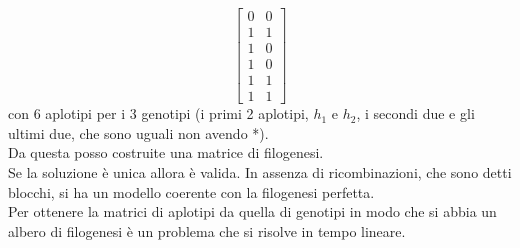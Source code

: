 \documentclass[a4paper,12pt, oneside]{book}
\begin{document}
\[\left[
  \begin{matrix}
    0 & 0\\
    1 & 1\\
    1 & 0\\
    1 & 0\\
    1 & 1\\
    1 & 1
  \end{matrix}\right]
\]
con 6 aplotipi per i 3 genotipi (i primi 2 aplotipi, $h_1$ e $h_2$, i secondi
due e gli ultimi due, che sono uguali non avendo *).\\
Da questa posso costruite una matrice di filogenesi.\\
Se la soluzione è unica allora è valida. In assenza di ricombinazioni, che sono
detti blocchi, si ha un modello coerente con la filogenesi perfetta.\\
Per ottenere la matrici di aplotipi da quella di genotipi in modo che si abbia
un albero di filogenesi è un problema che si risolve in tempo lineare.
\end{document}
